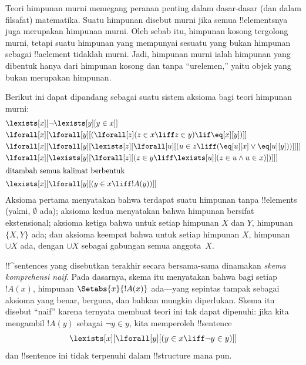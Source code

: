 \documentclass[../../../include/open-logic-section]{subfiles}
\begin{document}
\begin{ex}
Teori himpunan murni memegang peranan penting dalam dasar-dasar (dan dalam
filsafat) matematika. Suatu himpunan disebut murni jika semua !!{element}snya juga
merupakan himpunan murni. Oleh sebab itu, himpunan kosong tergolong murni,
tetapi suatu himpunan yang mempunyai sesuatu yang bukan himpunan sebagai
!!a{element} tidaklah murni. Jadi, himpunan murni ialah himpunan yang dibentuk
hanya dari himpunan kosong dan tanpa ``urelemen,'' yaitu objek yang bukan
merupakan himpunan.

Berikut ini dapat dipandang sebagai suatu sistem aksioma bagi teori himpunan
murni:
\begin{align*}
& \lexists[x][\lnot \lexists[y][y \in x]]\\
& \lforall[x][\lforall[y][(\lforall[z](z \in x \liff z \in y) \lif
\eq[x][y])]]\\
& \lforall[x][\lforall[y][\lexists[z][\lforall[u][(u \in z \liff
(\eq[u][x] \lor \eq[u][y]))]]]]\\
& \lforall[x][\lexists[y][\lforall[z][(z \in y \liff \lexists[u][(z \in
        u \land u \in x)])]]]\\
\intertext{ditambah semua kalimat berbentuk} &
\lexists[x][\lforall[y][(y \in x \liff !A(y))]]
\end{align*}
Aksioma pertama menyatakan bahwa terdapat suatu himpunan tanpa !!{element}s
(yakni, $\emptyset$ ada); aksioma kedua menyatakan bahwa himpunan bersifat
ekstensional; aksioma ketiga bahwa untuk setiap himpunan $X$ dan $Y$, himpunan
$\{X, Y\}$ ada; dan aksioma keempat bahwa untuk setiap himpunan $X$, himpunan
$\cup X$ ada, dengan $\cup X$ sebagai gabungan semua anggota~$X$.

!!^{sentence}s yang disebutkan terakhir secara bersama-sama dinamakan
\emph{skema komprehensi naif}. Pada dasarnya, skema itu menyatakan bahwa bagi
setiap $!A(x)$, himpunan $\Setabs{x}{!A(x)}$ ada---yang sepintas tampak sebagai
aksioma yang benar, berguna, dan bahkan mungkin diperlukan. Skema itu disebut
``naif'' karena ternyata membuat teori ini tak dapat dipenuhi: jika kita
mengambil $!A(y)$ sebagai $\lnot y \in y$, kita memperoleh !!{sentence}
\[
\lexists[x][\lforall[y][(y \in x \liff \lnot y \in y)]]
\]
dan !!{sentence} ini tidak terpenuhi dalam !!{structure} mana pun.
\end{ex}
\end{document}
